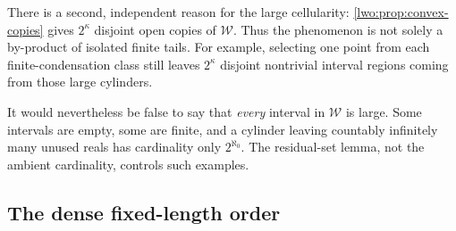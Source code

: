 \documentclass[11pt,a4paper]{article}
\theoremstyle{definition}
\theoremstyle{remark}
\newcommand{\W}{\mathcal W}
\begin{document}
There is a second, independent reason for the large cellularity:
\cref{lwo:prop:convex-copies} gives $2^\kappa$ disjoint open copies of $\W$.
Thus the phenomenon is not solely a by-product of isolated finite tails.
For example, selecting one point from each finite-condensation class still
leaves $2^\kappa$ disjoint nontrivial interval regions coming from those
large cylinders.

It would nevertheless be false to say that \emph{every} interval in $\W$
is large. Some intervals are empty, some are finite, and a cylinder leaving
countably infinitely many unused reals has cardinality only $2^{\aleph_0}$.
The residual-set lemma, not the ambient cardinality, controls such examples.

\subsection{The dense fixed-length order}
\end{document}
